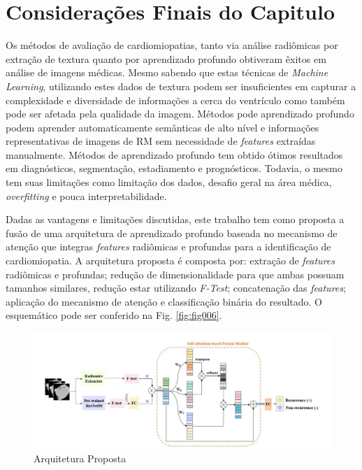\section{Considerações Finais do Capitulo}
\label{subsec:rcond_cap_3}

Os métodos de avaliação de cardiomiopatias, tanto via análise radiômicas por extração de textura quanto por aprendizado profundo obtiveram êxitos em análise de imagens médicas. Mesmo sabendo que estas técnicas de \textit{Machine Learning}, utilizando estes dados de textura podem ser insuficientes em capturar a complexidade e diversidade de informações a cerca do ventrículo como também pode ser afetada pela qualidade da imagem. Métodos pode aprendizado profundo podem aprender automaticamente semânticas de alto nível e informações representativas de imagens de RM sem necessidade de \textit{features} extraídas manualmente.
Métodos de aprendizado profundo tem obtido ótimos resultados em diagnósticos, segmentação, estadiamento e prognósticos. Todavia, o mesmo tem suas limitações como limitação dos dados, desafio geral na área médica, \textit{overfitting} e pouca interpretabilidade.

Dadas as vantagens e limitações discutidas, este trabalho tem como proposta a fusão de uma arquitetura de aprendizado profundo baseada no mecanismo de atenção que integras \textit{features} radiômicas e profundas para a identificação de cardiomiopatia. A arquitetura proposta é composta por: extração de \textit{features} radiômicas e profundas; redução de dimensionalidade para que ambas possuam tamanhos similares, redução estar utilizando \textit{F-Test}; concatenação das \textit{features}; aplicação do mecanismo de atenção e classificação binária do resultado. O esquemático pode ser conferido na Fig. \ref{fig:fig006}.

\begin{figure}[htbp]
    \centering
    \includegraphics[width=1\textwidth]{figures/fig006.png}
    \caption{Arquitetura Proposta}
    \label{fig:fig00}
\end{figure}

